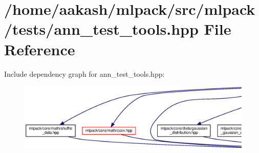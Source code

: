 \section{/home/aakash/mlpack/src/mlpack/tests/ann\+\_\+test\+\_\+tools.hpp File Reference}
\label{ann__test__tools_8hpp}
Include dependency graph for ann\+\_\+test\+\_\+tools.\+hpp\+:
\nopagebreak
\begin{figure}[H]
\begin{center}
\leavevmode
\includegraphics[width=350pt]{ann__test__tools_8hpp__incl}
\end{center}
\end{figure}
